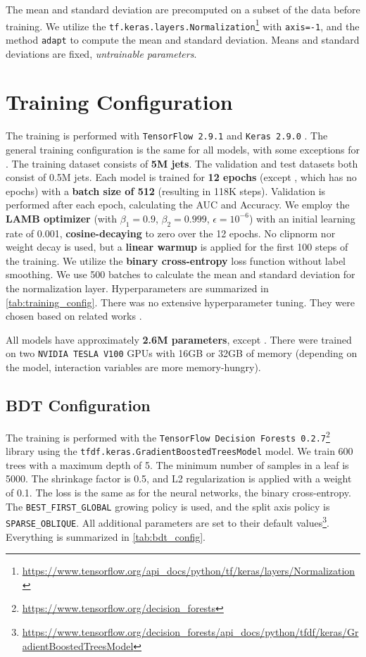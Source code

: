 The mean and standard deviation are precomputed on a subset of the data before training.
We utilize the \texttt{tf.keras.layers.Normalization}\footnote{\url{https://www.tensorflow.org/api_docs/python/tf/keras/layers/Normalization}} with \texttt{axis=-1}, and the method \texttt{adapt} to compute the mean and standard deviation.
Means and standard deviations are fixed, \emph{untrainable parameters}.


\section{Training Configuration}
\label{sec:training_config}

The training is performed with \texttt{TensorFlow 2.9.1} \cite{tf} and \texttt{Keras 2.9.0} \cite{keras}.
The general training configuration is the same for all models, with some exceptions for \bdt.
The training dataset consists of \textbf{5M jets}.
The validation and test datasets both consist of 0.5M jets.
Each model is trained for \textbf{12 epochs} (except \bdt, which has no epochs) with a \textbf{batch size of 512} (resulting in 118K steps).
Validation is performed after each epoch, calculating the AUC and Accuracy.
We employ the \textbf{LAMB optimizer} (with $\beta_1= 0.9$, $\beta_2= 0.999$, $\epsilon= 10^{-6}$) with an initial learning rate of 0.001, \textbf{cosine-decaying} to zero over the 12 epochs.
No clipnorm nor weight decay is used, but a \textbf{linear warmup} is applied for the first 100 steps of the training.
We utilize the \textbf{binary cross-entropy} loss function without label smoothing.
We use 500 batches to calculate the mean and standard deviation for the normalization layer.
Hyperparameters are summarized in \cref{tab:training_config}.
There was no extensive hyperparameter tuning. 
They were chosen based on related works \cite{deit3,part,cait,bert}.

All models have approximately \textbf{2.6M parameters}, except \bdt.
There were trained on two \texttt{NVIDIA TESLA V100} GPUs with 16GB or 32GB of memory (depending on the model, interaction variables are more memory-hungry).

\subsection{BDT Configuration}
\label{sec:bdt_config}

The training is performed with the \texttt{TensorFlow Decision Forests 0.2.7}\footnote{\url{https://www.tensorflow.org/decision_forests}} library using the \texttt{tfdf.keras.GradientBoostedTreesModel} model.
We train 600 trees with a maximum depth of 5.
The minimum number of samples in a leaf is 5000.
The shrinkage factor is 0.5, and L2 regularization is applied with a weight of 0.1.
The loss is the same as for the neural networks, the binary cross-entropy.
The \texttt{BEST\_FIRST\_GLOBAL} growing policy is used, and the split axis policy is \texttt{SPARSE\_OBLIQUE}.
All additional parameters are set to their default values\footnote{\url{https://www.tensorflow.org/decision_forests/api_docs/python/tfdf/keras/GradientBoostedTreesModel}}.
Everything is summarized in \cref{tab:bdt_config}.

